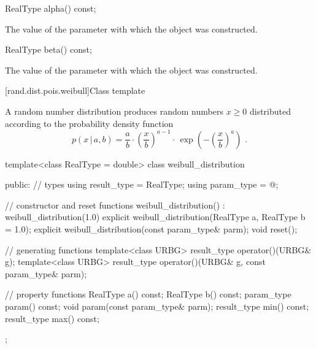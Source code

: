 \begin{indexed}{}
\begin{itemdecl}
RealType alpha() const;
\end{itemdecl}
\end{indexed}

\begin{itemdescr}
\pnum
\returns
The value of the  parameter
 with which the object was constructed.
\end{itemdescr}

\begin{indexed}{}
\begin{itemdecl}
RealType beta() const;
\end{itemdecl}
\end{indexed}

\begin{itemdescr}
\pnum
\returns
The value of the  parameter
 with which the object was constructed.
\end{itemdescr}


[rand.dist.pois.weibull]{Class template }%
%
%

\pnum
A  random number distribution
produces random numbers $x \geq 0$
distributed according to
the probability density function%
%
%
\[ p(x\,|\,a,b) = \frac{a}{b}
     \cdot \left(\frac{x}{b}\right)^{a-1}
     \cdot \, \exp\left( -\left(\frac{x}{b}\right)^a\right)
     \text{ .} \]

%
%
\begin{codeblock}
template<class RealType = double>
  class weibull_distribution {
  public:
    // types
    using result_type = RealType;
    using param_type  = @\unspec@;

    // constructor and reset functions
    weibull_distribution() : weibull_distribution(1.0) {}
    explicit weibull_distribution(RealType a, RealType b = 1.0);
    explicit weibull_distribution(const param_type& parm);
    void reset();

    // generating functions
    template<class URBG>
      result_type operator()(URBG& g);
    template<class URBG>
      result_type operator()(URBG& g, const param_type& parm);

    // property functions
    RealType a() const;
    RealType b() const;
    param_type param() const;
    void param(const param_type& parm);
    result_type min() const;
    result_type max() const;
  };
\end{codeblock}

